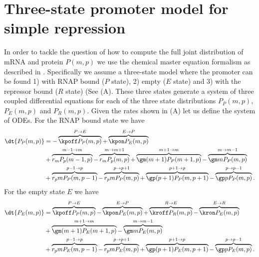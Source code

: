 \section{Three-state promoter model for simple repression}

In order to tackle the question of how to compute the full joint distribution of
mRNA and protein $P(m, p)$ we use the chemical master equation formalism as
described in . Specifically we assume a three-state model
where the promoter can be found 1) with RNAP bound ($P$ state), 2) empty ($E$
state) and 3) with the repressor bound ($R$ state) (See
(A). These three states generate a system of three
coupled differential equations for each of the three state distributions $P_P(m,
p)$, $P_E(m, p)$ and $P_R(m, p)$. Given the rates shown in
(A) let us define the system of ODEs. For the RNAP
bound state we have
\begin{equation}
  \begin{aligned}
    \dt{P_P(m, p)} &=
    - \overbrace{\kpoff P_P(m, p)}^{P \rightarrow E} %
    + \overbrace{\kpon P_E(m, p)}^{E \rightarrow P}\\ %
    &+ \overbrace{r_m P_p(m-1, p)}^{m-1 \rightarrow m} %
    - \overbrace{r_m P_p(m, p)}^{m \rightarrow m+1}%
    + \overbrace{\gm (m + 1) P_P(m+1 , p)}^{m+1 \rightarrow m} %
    - \overbrace{\gm m P_P(m , p)}^{m \rightarrow m-1}\\ %
    &+ \overbrace{r_p m P_P(m, p - 1)}^{p-1 \rightarrow p} %
    - \overbrace{r_p m P_P(m, p)}^{p \rightarrow p+1} %
    + \overbrace{\gp (p + 1) P_P(m, p + 1)}^{p + 1 \rightarrow p} %
    - \overbrace{\gp p P_P(m, p)}^{p \rightarrow p-1}. %
  \end{aligned}
\end{equation}
For the empty state $E$ we have
\begin{equation}
  \begin{aligned}
    \dt{P_E(m, p)} &=
    \overbrace{\kpoff P_P(m, p)}^{P \rightarrow E} %
    - \overbrace{\kpon P_E(m, p)}^{E \rightarrow P} %
    + \overbrace{\kroff P_R(m, p)}^{R \rightarrow E} %
    - \overbrace{\kron P_E(m, p)}^{E \rightarrow R}\\ %
    &+ \overbrace{\gm (m + 1) P_E(m+1 , p)}^{m+1 \rightarrow m} %
    - \overbrace{\gm m P_E(m , p)}^{m \rightarrow m-1}\\ %
    &+ \overbrace{r_p m P_E(m, p - 1)}^{p-1 \rightarrow p} %
    - \overbrace{r_p m P_E(m, p)}^{p \rightarrow p+1} %
    + \overbrace{\gp (p + 1) P_E(m, p + 1)}^{p + 1 \rightarrow p} %
    - \overbrace{\gp p P_E(m, p)}^{p \rightarrow p-1}. %
  \end{aligned}
\end{equation}
